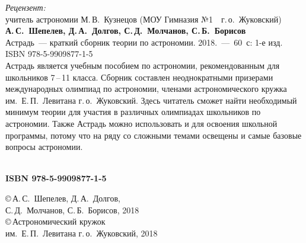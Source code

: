 \setcounter{page}{1}
\thispagestyle{empty}
\vspace*{1pc}
{\small {\itshape Рецензент:}\\ учитель астрономии М.\,В.~Кузнецов (МОУ Гимназия №1~~г.\,о.~Жуковский)}\\[2pc]

{\hspace{1pc} {\bfseries А.\,С.~Шепелев, Д.\,А.~Долгов, С.\,Д.~Молчанов, С.\,Б.~Борисов}\\ Астрадь~--- краткий сборник теории по астрономии. 2018.~---~60~с: 1-е изд.}\\ 
ISBN 978-5-9909877-1-5\\[3pc]

\hspace{1pc} {\small Астрадь является учебным пособием по астрономии, рекомендованным для школьников 7\,--\,11 класса. Сборник составлен неоднократными призерами международных олимпиад по астрономии, членами астрономического кружка им.~Е.\,П.~Левитана г.\,о.~Жуковский. Здесь читатель сможет найти необходимый минимум теории для участия в различных олимпиадах школьников по астрономии. Также Астрадь можно использовать и для освоения школьной программы, потому что на ряду со сложными темами освещены и самые базовые вопросы астрономии.}\\[4pc]

\\[6pc]


\begin{minipage}[t]{0.4\tw}
	{\bfseries ISBN 978-5-9909877-1-5}
\end{minipage}
\hfill
\begin{minipage}[t]{0.57\tw}
	\copyright\,А.\,С.~Шепелев, Д.\,А.~Долгов,\\
	 \hspace*{8pt} С.\,Д.~Молчанов, С.\,Б.~Борисов, 2018\\[3pt]
	\copyright\,Астрономический кружок\\ \hspace*{8pt} им.~Е.\,П.~Левитана г.\,о.~Жуковский, 2018
\end{minipage}
\newpage